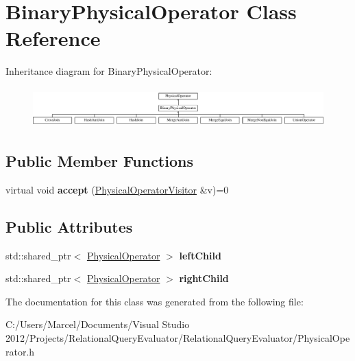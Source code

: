 \hypertarget{class_binary_physical_operator}{\section{Binary\+Physical\+Operator Class Reference}
\label{class_binary_physical_operator}
}
Inheritance diagram for Binary\+Physical\+Operator\+:\begin{figure}[H]
\begin{center}
\leavevmode
\includegraphics[height=1.538462cm]{class_binary_physical_operator}
\end{center}
\end{figure}
\subsection*{Public Member Functions}
\begin{DoxyCompactItemize}
\item 
\hypertarget{class_binary_physical_operator_a29ec622920006cb5428bf2c259918347}{virtual void {\bfseries accept} (\hyperlink{class_physical_operator_visitor}{Physical\+Operator\+Visitor} \&v)=0}\label{class_binary_physical_operator_a29ec622920006cb5428bf2c259918347}

\end{DoxyCompactItemize}
\subsection*{Public Attributes}
\begin{DoxyCompactItemize}
\item 
\hypertarget{class_binary_physical_operator_a60ea09dbc34f680f024a9946c3634cbd}{std\+::shared\+\_\+ptr$<$ \hyperlink{class_physical_operator}{Physical\+Operator} $>$ {\bfseries left\+Child}}\label{class_binary_physical_operator_a60ea09dbc34f680f024a9946c3634cbd}

\item 
\hypertarget{class_binary_physical_operator_a9247498cd4b4e35968e2aa78bac17016}{std\+::shared\+\_\+ptr$<$ \hyperlink{class_physical_operator}{Physical\+Operator} $>$ {\bfseries right\+Child}}\label{class_binary_physical_operator_a9247498cd4b4e35968e2aa78bac17016}

\end{DoxyCompactItemize}


The documentation for this class was generated from the following file\+:\begin{DoxyCompactItemize}
\item 
C\+:/\+Users/\+Marcel/\+Documents/\+Visual Studio 2012/\+Projects/\+Relational\+Query\+Evaluator/\+Relational\+Query\+Evaluator/Physical\+Operator.\+h\end{DoxyCompactItemize}
